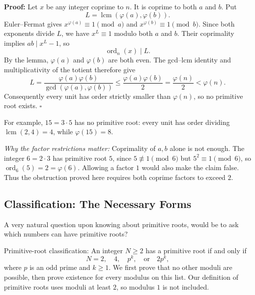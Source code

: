 \documentclass[a4paper,11pt,abstracton]{scrartcl}
\theoremstyle{dotlessP}
\theoremstyle{dotlessS}
\theoremstyle{remark}
\theoremstyle{definition}
\begin{document}
\textbf{Proof:}
Let $x$ be any integer coprime to $n$. It is coprime to both $a$ and $b$.
Put
\[
    L=\operatorname{lcm}(\varphi(a),\varphi(b)).
\]
Euler--Fermat gives $x^{\varphi(a)}\equiv1\pmod a$ and
$x^{\varphi(b)}\equiv1\pmod b$. Since both exponents divide $L$,
we have $x^L\equiv1$ modulo both $a$ and $b$.
Their coprimality implies $ab\mid x^L-1$, so
\[
    \operatorname{ord}_n(x)\mid L.
\]
By the lemma, $\varphi(a)$ and $\varphi(b)$ are both even. The gcd--lcm
identity and multiplicativity of the totient therefore give
\[
    L=\frac{\varphi(a)\varphi(b)}{\gcd(\varphi(a),\varphi(b))}
      \leq\frac{\varphi(a)\varphi(b)}{2}
      =\frac{\varphi(n)}{2}<\varphi(n).
\]
Consequently every unit has order strictly smaller than $\varphi(n)$,
so no primitive root exists.
\hfill$\square$



\begin{example_box}
For example, $15=3\cdot5$ has no primitive root: every unit has order
dividing $\operatorname{lcm}(2,4)=4$, while $\varphi(15)=8$.
\end{example_box}



\begin{example_box}
\textit{Why the factor restrictions matter:}
Coprimality of $a,b$ alone is not enough. The integer $6=2\cdot3$
has primitive root $5$, since $5\not\equiv1\pmod6$ but
$5^2\equiv1\pmod6$, so $\operatorname{ord}_6(5)=2=\varphi(6)$.
Allowing a factor $1$ would also make the claim false. Thus the
obstruction proved here requires both coprime factors to exceed $2$.
\end{example_box}


\subsection{Classification: The Necessary Forms}

A very natural question upon knowing about primitive roots, would be to ask which numbers can have primitive roots?

\begin{mainbox}{Primitive-root classification:}
An integer $N\geq2$ has a primitive root if and only if
\[
    \boxed{N=2,\quad4,\quad p^k,\quad\text{or}\quad2p^k,}
\]
where $p$ is an odd prime and $k\geq1$.
We first prove that no other moduli are possible, then prove existence
for every modulus on this list. Our definition of primitive roots
uses moduli at least $2$, so modulus $1$ is not included.
\end{mainbox}
\end{document}
